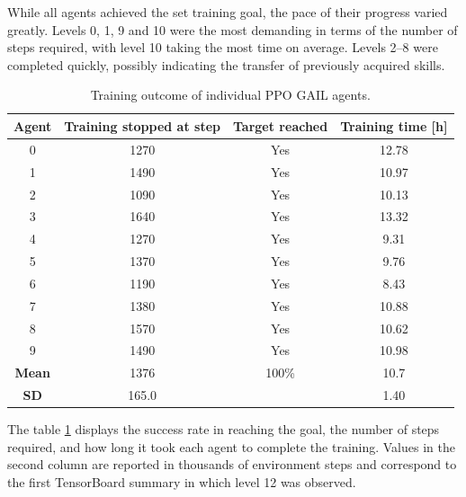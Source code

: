 While all agents achieved the set training goal, the pace of their progress varied greatly. Levels 0, 1, 9 and 10 were the most demanding in terms of the number of steps required, with level 10 taking the most time on average. Levels 2–8 were completed quickly, possibly indicating the transfer of previously acquired skills.
\begin{table}[htbp]
	\centering
	\caption{
		Training outcome of individual PPO GAIL agents.
	}
	\label{tab:gail_training_time}
	
	\begin{tabular}{c c c c}
		\toprule
		
		\textbf{Agent}
		&
		\textbf{Training stopped at step}
		&
		\textbf{Target reached}
		&
		\textbf{Training time [h]}
		\\
		
		\midrule
		
		0  & 1270 & Yes & 12.78 \\
		1  & 1490 & Yes & 10.97 \\
		2  & 1090 & Yes & 10.13 \\
		3  & 1640 & Yes & 13.32 \\
		4  & 1270 & Yes & 9.31 \\
		5  & 1370 & Yes & 9.76 \\
		6  & 1190 & Yes & 8.43 \\
		7  & 1380 & Yes & 10.88 \\
		8  & 1570 & Yes & 10.62 \\
		9  & 1490 & Yes & 10.98\\
		
		\midrule
		
		\textbf{Mean}
		&
		1376
		&
		100\%
		&
		10.7 \\
		
		\textbf{SD}
		&
		165.0
		&
		
		&
		1.40 \\
		
		\bottomrule
	\end{tabular}
	
\end{table}


The table \ref{tab:gail_training_time} displays the success rate in reaching the goal, the number of steps required, and how long it took each agent to complete the training. Values in the second column are reported in thousands of environment steps and correspond to the first TensorBoard summary in which level 12 was observed.

